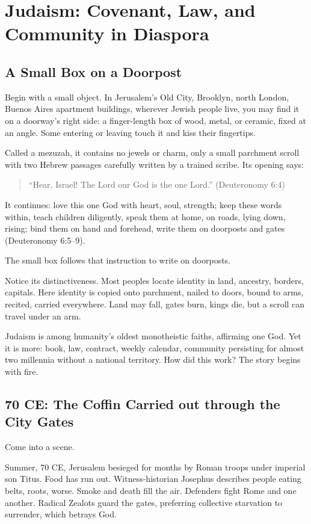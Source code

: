 \chapter[Judaism: Covenant, Law, and Diaspora]{Judaism: Covenant, Law, and Community in Diaspora}
\section{A Small Box on a Doorpost}
Begin with a small object. In Jerusalem's Old City, Brooklyn, north London, Buenos Aires apartment buildings, wherever Jewish people live, you may find it on a doorway's right side: a finger-length box of wood, metal, or ceramic, fixed at an angle. Some entering or leaving touch it and kiss their fingertips.

Called a mezuzah, it contains no jewels or charm, only a small parchment scroll with two Hebrew passages carefully written by a trained scribe. Its opening says:

\begin{quote}
``Hear, Israel! The Lord our God is the one Lord.'' (Deuteronomy 6:4)
\end{quote}
It continues: love this one God with heart, soul, strength; keep these words within, teach children diligently, speak them at home, on roads, lying down, rising; bind them on hand and forehead, write them on doorposts and gates (Deuteronomy 6:5--9).

The small box follows that instruction to write on doorposts.

Notice its distinctiveness. Most peoples locate identity in land, ancestry, borders, capitals. Here identity is copied onto parchment, nailed to doors, bound to arms, recited, carried everywhere. Land may fall, gates burn, kings die, but a scroll can travel under an arm.

Judaism is among humanity's oldest monotheistic faiths, affirming one God. Yet it is more: book, law, contract, weekly calendar, community persisting for almost two millennia without a national territory. How did this work? The story begins with fire.

\section[70 CE: A Coffin through the Gates]{70 CE: The Coffin Carried out through the City Gates}
Come into a scene.

Summer, 70 CE, Jerusalem besieged for months by Roman troops under imperial son Titus. Food has run out. Witness-historian Josephus describes people eating belts, roots, worse. Smoke and death fill the air. Defenders fight Rome and one another. Radical Zealots guard the gates, preferring collective starvation to surrender, which betrays God.

